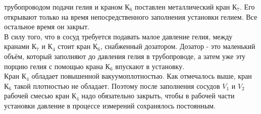 \documentclass[12pt]{article}
\begin{document}
трубопроводом подачи гелия и краном $К_6$ поставлен металлический кран $К_7$. Его открывают только на время непосредственного заполнения 
установки гелием. Все остальное время он закрыт.\\
В силу того, что в сосуд требуется подавать малое давление гелия, между кранами $К_7$ и $К_4$ стоит кран $К_6$, снабженный дозатором. 
Дозатор - это маленький объём, который заполняют до давления гелия в трубопроводе, а затем уже эту порцию гелия с помощью крана 
$К_6$ впускают в установку.\\
Кран $К_4$ обладает повышенной вакуумоплотностью. Как отмечалось выше, кран $К_6$ такой плотностью не обладает. 
Поэтому после заполнения сосудов $V_1$ и $V_2$ рабочей смесью кран $К_4$ надо обязательно закрыть, чтобы в рабочей части 
установки давление в процессе измерений сохранялось постоянным.\\
\end{document}
